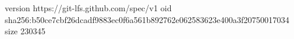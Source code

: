 version https://git-lfs.github.com/spec/v1
oid sha256:b50ce7cbf26dcadf9883ec0f6a561b892762e062583623e400a3f20750017034
size 230345
